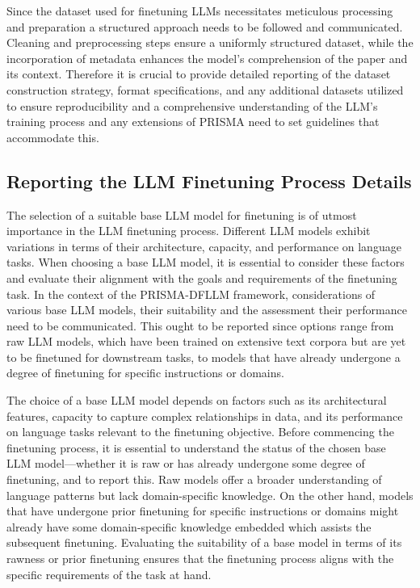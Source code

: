 \documentclass{article}
\begin{document}
Since the dataset used for finetuning LLMs necessitates meticulous processing and preparation a structured approach needs to be followed and communicated. Cleaning and preprocessing steps ensure a uniformly structured dataset, while the incorporation of metadata enhances the model's comprehension of the paper and its context. Therefore it is crucial to provide detailed reporting of the dataset construction strategy, format specifications, and any additional datasets utilized to ensure reproducibility and a comprehensive understanding of the LLM's training process and any extensions of PRISMA need to set guidelines that accommodate this.




\subsection{Reporting the LLM Finetuning Process Details}

The selection of a suitable base LLM model for finetuning is of utmost importance in the LLM finetuning process. Different LLM models exhibit variations in terms of their architecture, capacity, and performance on language tasks. When choosing a base LLM model, it is essential to consider these factors and evaluate their alignment with the goals and requirements of the finetuning task. In the context of the PRISMA-DFLLM framework, considerations of various base LLM models, their suitability and the assessment their performance need to be communicated. This ought to be reported since options range from raw LLM models, which have been trained on extensive text corpora but are yet to be finetuned for downstream tasks, to models that have already undergone a degree of finetuning for specific instructions or domains.

The choice of a base LLM model depends on factors such as its architectural features, capacity to capture complex relationships in data, and its performance on language tasks relevant to the finetuning objective. Before commencing the finetuning process, it is essential to understand the status of the chosen base LLM model—whether it is raw or has already undergone some degree of finetuning, and to report this. Raw models offer a broader understanding of language patterns but lack domain-specific knowledge. On the other hand, models that have undergone prior finetuning for specific instructions or domains might already have some domain-specific knowledge embedded which assists the subsequent finetuning. Evaluating the suitability of a base model in terms of its rawness or prior finetuning ensures that the finetuning process aligns with the specific requirements of the task at hand.
\end{document}
